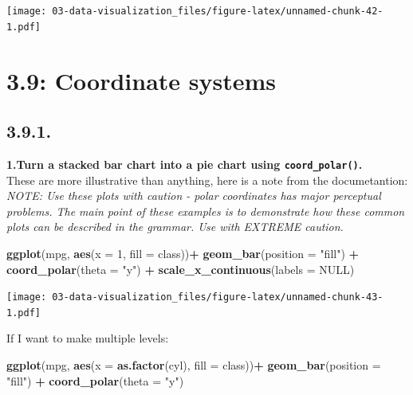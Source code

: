 \documentclass[]{book}
\newenvironment{Shaded}{\begin{snugshade}}{\end{snugshade}}
\newcommand{\DataTypeTok}[1]{\textcolor[rgb]{0.13,0.29,0.53}{#1}}
\newcommand{\DecValTok}[1]{\textcolor[rgb]{0.00,0.00,0.81}{#1}}
\newcommand{\KeywordTok}[1]{\textcolor[rgb]{0.13,0.29,0.53}{\textbf{#1}}}
\newcommand{\NormalTok}[1]{#1}
\newcommand{\OperatorTok}[1]{\textcolor[rgb]{0.81,0.36,0.00}{\textbf{#1}}}
\newcommand{\OtherTok}[1]{\textcolor[rgb]{0.56,0.35,0.01}{#1}}
\newcommand{\StringTok}[1]{\textcolor[rgb]{0.31,0.60,0.02}{#1}}
\theoremstyle{definition}
\theoremstyle{definition}
\theoremstyle{definition}
\theoremstyle{remark}
\begin{document}
\texttt{[image: 03-data-visualization\_files/figure-latex/unnamed-chunk-42-1.pdf]}

\hypertarget{coordinate-systems}{%
\section{3.9: Coordinate systems}\label{coordinate-systems}}

\hypertarget{section-6}{%
\subsection{3.9.1.}\label{section-6}}

\textbf{1.Turn a stacked bar chart into a pie chart using
\texttt{coord\_polar()}.}\\
These are more illustrative than anything, here is a note from the
documetantion:\\
\emph{NOTE: Use these plots with caution - polar coordinates has major
perceptual problems. The main point of these examples is to demonstrate
how these common plots can be described in the grammar. Use with EXTREME
caution.}

\begin{Shaded}
\begin{Highlighting}[]
\KeywordTok{ggplot}\NormalTok{(mpg, }\KeywordTok{aes}\NormalTok{(}\DataTypeTok{x =} \DecValTok{1}\NormalTok{, }\DataTypeTok{fill =}\NormalTok{ class))}\OperatorTok{+}
\StringTok{  }\KeywordTok{geom_bar}\NormalTok{(}\DataTypeTok{position =} \StringTok{"fill"}\NormalTok{) }\OperatorTok{+}
\StringTok{  }\KeywordTok{coord_polar}\NormalTok{(}\DataTypeTok{theta =} \StringTok{"y"}\NormalTok{) }\OperatorTok{+}\StringTok{ }
\StringTok{  }\KeywordTok{scale_x_continuous}\NormalTok{(}\DataTypeTok{labels =} \OtherTok{NULL}\NormalTok{)}
\end{Highlighting}
\end{Shaded}

\texttt{[image: 03-data-visualization\_files/figure-latex/unnamed-chunk-43-1.pdf]}

If I want to make multiple levels:

\begin{Shaded}
\begin{Highlighting}[]
\KeywordTok{ggplot}\NormalTok{(mpg, }\KeywordTok{aes}\NormalTok{(}\DataTypeTok{x =} \KeywordTok{as.factor}\NormalTok{(cyl), }\DataTypeTok{fill =}\NormalTok{ class))}\OperatorTok{+}
\StringTok{  }\KeywordTok{geom_bar}\NormalTok{(}\DataTypeTok{position =} \StringTok{"fill"}\NormalTok{) }\OperatorTok{+}
\StringTok{  }\KeywordTok{coord_polar}\NormalTok{(}\DataTypeTok{theta =} \StringTok{"y"}\NormalTok{)}
\end{Highlighting}
\end{Shaded}
\end{document}
